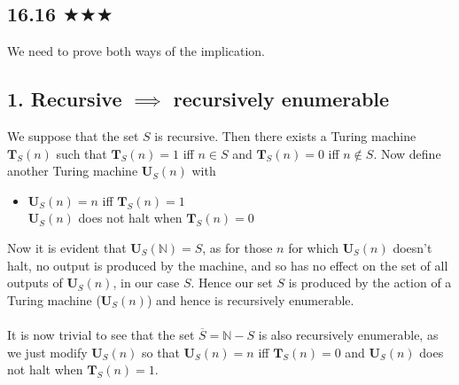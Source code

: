 

\subsection{16.16 $\bigstar \bigstar\bigstar $}
We need to prove both ways of the implication.
\subsection*{1. Recursive $\implies$ recursively enumerable}
We suppose that the set $S$ is recursive. Then there exists a Turing machine $\mathbf{T}_S(n)$ such that $\mathbf{T}_S(n)=1$ iff $n\in S$ and $\mathbf{T}_S(n)=0$ iff $n\notin S$. Now define another Turing machine $\mathbf{U}_S(n)$ with
\begin{itemize}
\item[] $\mathbf{U}_S(n)=n$ iff $\mathbf{T}_S(n)=1$ \\ $\mathbf{U}_S(n)$ does not halt when $\mathbf{T}_S(n)=0$
\end{itemize} 
Now it is evident that $\mathbf{U}_S(\mathbb{N})=S$, as for those $n$ for which $\mathbf{U}_S(n)$ doesn't halt, no output is produced by the machine, and so has no effect on the set of all outputs of $\mathbf{U}_S(n)$, in our case $S$. Hence our set $S$ is produced by the action of a Turing machine ($\mathbf{U}_S(n)$) and hence is recursively enumerable.\\ \\ It is now trivial to see that the set $\overline{S}=\mathbb{N}-S$ is also recursively enumerable, as we just modify $\mathbf{U}_S(n)$ so that $\mathbf{U}_S(n)=n$ iff $\mathbf{T}_S(n)=0$ and $\mathbf{U}_S(n)$ does not halt when $\mathbf{T}_S(n)=1$.

